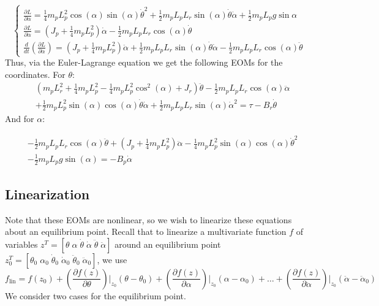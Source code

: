 \[
    \begin{cases}
        \frac{\partial L}{\partial \alpha}=\frac{1}{4}m_pL_p^2\cos{(\alpha)}\sin{(\alpha)}\dot{\theta}^2+\frac{1}{2}m_pL_pL_r\sin{(\alpha)}\dot{\theta}\dot{\alpha}+ \frac{1}{2}m_pL_pg\sin{\alpha} \\
        \frac{\partial L}{\partial \dot{\alpha}}= \left(J_p+\frac{1}{4}m_pL_p^2\right)\dot{\alpha}-\frac{1}{2}m_pL_pL_r\cos{(\alpha)}\dot{\theta}                                                   \\
        \frac{d}{dt} \left(\frac{\partial L}{\partial \dot{\alpha}}\right)= \left(J_p+\frac{1}{4}m_pL_p^2\right)\ddot{\alpha}+\frac{1}{2}m_pL_pL_r\sin{(\alpha)}\dot{\theta}\dot{\alpha}-\frac{1}{2}m_pL_pL_r\cos{(\alpha)} \ddot{\theta}
    \end{cases}
\]
Thus, via the Euler-Lagrange equation we get the following EOMs for the coordinates. For \( \theta \):
\begin{align*}
     & \left(m_p L_{r}^{2} + \frac{1}{4} m_p L_{p}^{2} - \frac{1}{4} m_p L_{p}^{2} \cos^2(\alpha) + J_r\right) \ddot{\theta} - \frac{1}{2} m_p L_p L_r \cos(\alpha) \ddot{\alpha} \\
     & + \frac{1}{2} m_p L_{p}^{2} \sin(\alpha)\cos(\alpha) \dot{\theta}\dot{\alpha} + \frac{1}{2}m_p L_p L_r \sin(\alpha) \dot{\alpha}^{2} = \tau - B_r \dot{\theta}
\end{align*}
And for \( \alpha \):

\begin{align*}
     & -\frac{1}{2} m_p L_p L_r \cos(\alpha) \ddot{\theta} + \left(J_p + \frac{1}{4} m_p L_{p}^{2}\right)\ddot{\alpha} - \frac{1}{4} m_p L_{p}^{2} \sin(\alpha)\cos(\alpha) \dot{\theta}^{2} \\
     & - \frac{1}{2} m_p L_{p} g \sin(\alpha) = - B_p \dot{\alpha}
\end{align*}

\subsection{Linearization}
Note that these EOMs are nonlinear, so we wish to linearize these equations about an equilibrium point. Recall that to linearize a multivariate function \( f \) of variables \( z^T = [\theta \; \alpha \; \dot{\theta} \; \dot{\alpha} \; \ddot{\theta} \; \ddot{\alpha}] \) around an equilibrium point \( z_{0}^T = [\theta_0 \; \alpha_0 \; \dot{\theta}_0 \; \dot{\alpha}_0 \; \ddot{\theta}_0 \; \ddot{\alpha}_0] \), we use
\[
    f_\text{lin} = f(z_0) + \left(\frac{\partial f(z)}{\partial \theta}\right) \bigg|_{z_0}  (\theta - \theta_0) +  \left(\frac{\partial f(z)}{\partial \alpha}\right) \bigg|_{z_0}  (\alpha - \alpha_0) + \dots +  \left(\frac{\partial f(z)}{\partial \ddot{\alpha}}\right) \bigg|_{z_0}  (\ddot{\alpha} - \ddot{\alpha}_0)
\]
We consider two cases for the equilibrium point.

